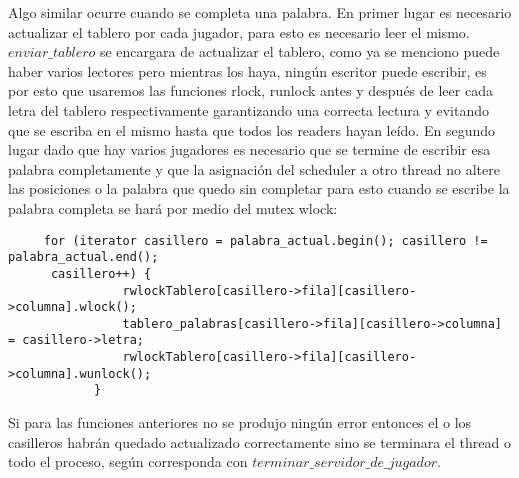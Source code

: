 Algo similar ocurre cuando se completa una palabra. En primer lugar es necesario actualizar el tablero por cada jugador, para esto es necesario leer el mismo.
$enviar\_tablero$ se encargara de actualizar el tablero, como ya se menciono puede haber varios lectores pero mientras los haya, ningún escritor puede escribir, es por esto que usaremos las funciones rlock, runlock antes y después de leer cada letra del tablero respectivamente garantizando una correcta lectura y evitando que se escriba en el mismo hasta que todos los readers hayan leído.
En segundo lugar dado que hay varios jugadores es necesario que se termine de escribir esa palabra completamente y que la asignación del scheduler a  otro thread no altere las posiciones o la palabra que quedo sin completar para esto cuando se escribe la palabra completa se hará por medio del mutex wlock:
\begin{verbatim}
     for (iterator casillero = palabra_actual.begin(); casillero != palabra_actual.end();
      casillero++) {
                rwlockTablero[casillero->fila][casillero->columna].wlock();
                tablero_palabras[casillero->fila][casillero->columna] = casillero->letra;
                rwlockTablero[casillero->fila][casillero->columna].wunlock();
            }
\end{verbatim}
Si para las funciones anteriores no se produjo ningún error entonces el o los casilleros habrán quedado actualizado correctamente sino se terminara el thread o todo el proceso, según corresponda con $terminar\_servidor\_de\_jugador$.
